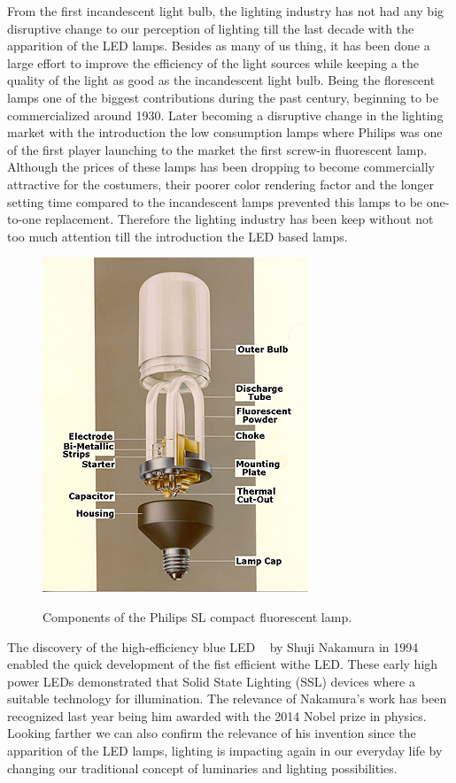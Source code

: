 From the first incandescent light bulb, the lighting industry has not had any big disruptive change to our perception of lighting till the last decade with the apparition of the LED lamps. Besides as many of us thing, it has been done a large effort to improve the efficiency of the light sources while keeping a the quality of the light as good as the incandescent light bulb. Being the florescent lamps one of the biggest contributions during the past century, beginning  to be commercialized around 1930. Later becoming a disruptive change in the lighting market with the introduction the low consumption lamps where Philips was one of the first player launching to the market the first screw-in fluorescent lamp. Although the prices of these lamps has been dropping to become commercially attractive for the costumers, their poorer color rendering factor and the longer setting time compared to the incandescent lamps prevented this lamps to be one-to-one replacement. Therefore the lighting industry has been keep without not too much attention till the introduction the LED based lamps.

\vspace{5mm} %

\begin{figure}[!h]
\centering
\includegraphics{./0_intro/img/phil1b.jpg}
\label{fig:philips_sl}
\caption{Components of the Philips SL compact fluorescent lamp. }
\end{figure}

The discovery of the high-efficiency blue LED ~\cite{94Nakamura} by Shuji Nakamura in 1994 enabled the quick development of the fist efficient withe LED. These early high power LEDs demonstrated that Solid State Lighting (SSL) devices  where a suitable technology for illumination. The relevance of Nakamura's work has been recognized last year being him awarded with the 2014 Nobel prize in physics. Looking farther we can also confirm the relevance of his invention since the apparition of the LED lamps, lighting is impacting again in our everyday life by changing our traditional concept of luminaries and lighting possibilities.

